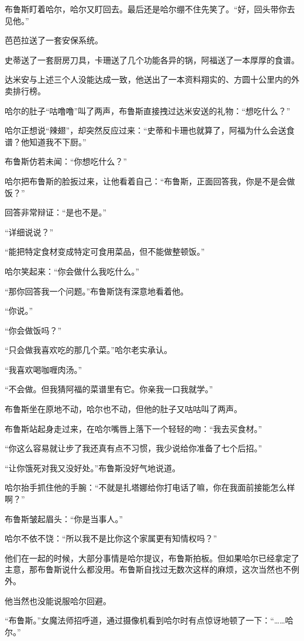 \documentclass[../main]{subfiles}
\begin{document}
布鲁斯盯着哈尔，哈尔又盯回去。最后还是哈尔绷不住先笑了。“好，回头带你去见他。”

芭芭拉送了一套安保系统。

史蒂送了一套厨房刀具，卡珊送了几个功能各异的锅，阿福送了一本厚厚的食谱。

达米安与上述三个人没能达成一致，他送出了一本资料翔实的、方圆十公里内的外卖排行榜。

哈尔的肚子“咕噜噜”叫了两声，布鲁斯直接拽过达米安送的礼物：“想吃什么？”

哈尔正想说“辣翅”，却突然反应过来：“史蒂和卡珊也就算了，阿福为什么会送食谱？他知道我不下厨。”

布鲁斯仿若未闻：“你想吃什么？”

哈尔把布鲁斯的脸扳过来，让他看着自己：“布鲁斯，正面回答我，你是不是会做饭？”

回答非常辩证：“是也不是。”

“详细说说？”

“能把特定食材变成特定可食用菜品，但不能做整顿饭。”

哈尔笑起来：“你会做什么我吃什么。”

“那你回答我一个问题。”布鲁斯饶有深意地看着他。

“你说。”

“你会做饭吗？”

“只会做我喜欢吃的那几个菜。”哈尔老实承认。

“我喜欢喝咖喱肉汤。”

“不会做。但我猜阿福的菜谱里有它。你亲我一口我就学。”

布鲁斯坐在原地不动，哈尔也不动，但他的肚子又咕咕叫了两声。

布鲁斯站起身走过来，在哈尔嘴唇上落下一个轻轻的吻：“我去买食材。”

“你这么容易就让步了我还真有点不习惯，我少说给你准备了七个后招。”

“让你饿死对我又没好处。”布鲁斯没好气地说道。

哈尔抬手抓住他的手腕：“不就是扎塔娜给你打电话了嘛，你在我面前接能怎么样啊？”

布鲁斯皱起眉头：“你是当事人。”

哈尔不依不饶：“所以我不是比你这个家属更有知情权吗？”

他们在一起的时候，大部分事情是哈尔提议，布鲁斯拍板。但如果哈尔已经拿定了主意，那布鲁斯说什么都没用。布鲁斯自找过无数次这样的麻烦，这次当然也不例外。

他当然也没能说服哈尔回避。

“布鲁斯。”女魔法师招呼道，通过摄像机看到哈尔时有点惊讶地顿了一下：“……哈尔。”
\end{document}
